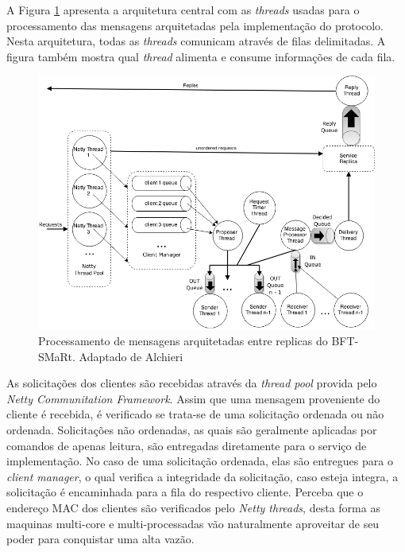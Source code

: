	A Figura \ref{fig:image5} apresenta a arquitetura central com as \textit{threads}  usadas para o processamento das mensagens arquitetadas pela implementação do protocolo. Nesta arquitetura, todas as \textit{threads} comunicam através de filas delimitadas. A figura também mostra qual \textit{thread} alimenta e consume informações de cada fila. \\  
	
	\begin{figure}[htb]
		\begin{center}
			
			\includegraphics[clip,width=13.0cm]{images/image5.png}
			\caption{Processamento de mensagens arquitetadas entre replicas do BFT-SMaRt. Adaptado de Alchieri~\cite{bessani3} }
			\label{fig:image5}
		\end{center}
	\end{figure}
	
	As solicitações dos clientes são recebidas através da \textit{thread pool} provida pelo \textit{Netty Communitation Framework}. Assim que uma mensagem proveniente do cliente é recebida, é verificado se trata-se de uma solicitação ordenada ou não ordenada. Solicitações não ordenadas, as quais são geralmente aplicadas por comandos de apenas leitura, são entregadas diretamente para o serviço de implementação. No caso de uma solicitação ordenada, elas são entregues para o \textit{client manager}, o qual verifica a integridade da solicitação, caso esteja integra, a solicitação é encaminhada para a fila do respectivo cliente. Perceba que o endereço MAC dos clientes são verificados pelo \textit{Netty threads}, desta forma as maquinas multi-core e multi-processadas vão naturalmente aproveitar de seu poder para conquistar uma alta vazão. \\ 
	
